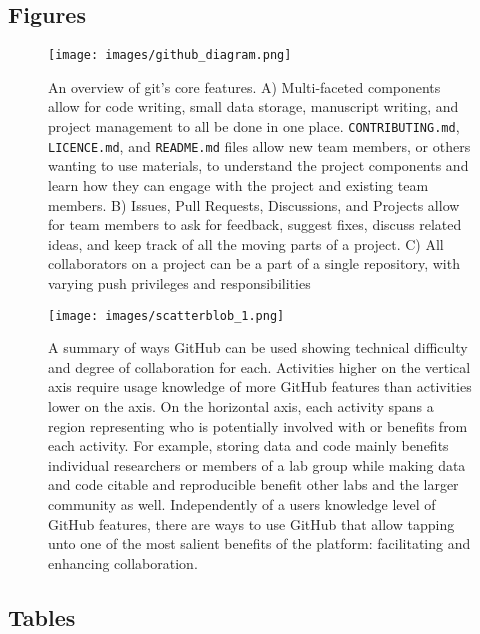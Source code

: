 \hypertarget{figures}{%
\subsection{Figures}\label{figures}}

\begin{figure}
\hypertarget{fig:github-diagram}{%
\centering
\texttt{[image: images/github\_diagram.png]}
\caption{An overview of git's core features. A) Multi-faceted components allow for code writing, small data storage, manuscript writing, and project management to all be done in one place. \texttt{CONTRIBUTING.md}, \texttt{LICENCE.md}, and \texttt{README.md} files allow new team members, or others wanting to use materials, to understand the project components and learn how they can engage with the project and existing team members. B) Issues, Pull Requests, Discussions, and Projects allow for team members to ask for feedback, suggest fixes, discuss related ideas, and keep track of all the moving parts of a project. C) All collaborators on a project can be a part of a single repository, with varying push privileges and responsibilities}\label{fig:github-diagram}
}
\end{figure}

\begin{figure}
\hypertarget{fig:scatterblob}{%
\centering
\texttt{[image: images/scatterblob\_1.png]}
\caption{A summary of ways GitHub can be used showing technical difficulty and degree of collaboration for each. Activities higher on the vertical axis require usage knowledge of more GitHub features than activities lower on the axis. On the horizontal axis, each activity spans a region representing who is potentially involved with or benefits from each activity. For example, storing data and code mainly benefits individual researchers or members of a lab group while making data and code citable and reproducible benefit other labs and the larger community as well. Independently of a users knowledge level of GitHub features, there are ways to use GitHub that allow tapping unto one of the most salient benefits of the platform: facilitating and enhancing collaboration.}\label{fig:scatterblob}
}
\end{figure}

\hypertarget{tables}{%
\subsection{Tables}\label{tables}}

